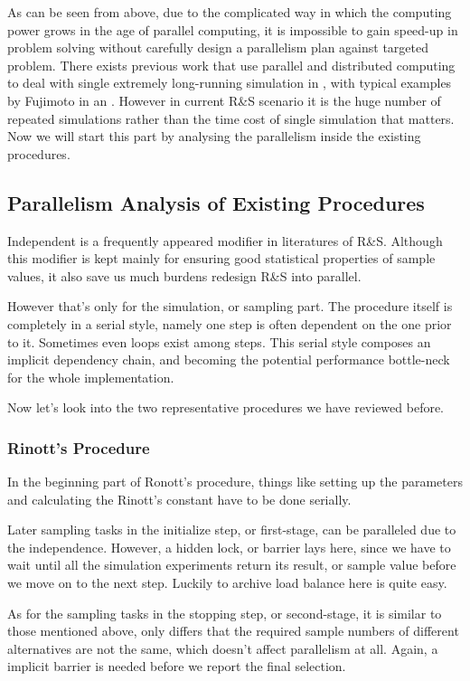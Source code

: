 \documentclass[12pt,a4paper]{report}
\begin{document}
As can be seen from above, due to the complicated way in which the computing power grows in the age of parallel computing, it is impossible to gain speed-up in problem solving without carefully design a parallelism plan against targeted problem. There exists previous work that use parallel and distributed computing to deal with single extremely long-running simulation in \cite{potwsc05ras}, with typical examples by Fujimoto in \cite{cotacm90fuji} an \cite{scsmasm10fuji}. However in current R\&S scenario it is the huge number of repeated simulations rather than the time cost of single simulation that matters. Now we will start this part by analysing the parallelism inside the existing procedures.

\subsection{Parallelism Analysis of Existing Procedures}

Independent is a frequently appeared modifier in literatures of R\&S. Although this modifier is kept mainly for ensuring good statistical properties of sample values, it also save us much burdens redesign R\&S into parallel.

However that's only for the simulation, or sampling part. The procedure itself is completely in a serial style, namely one step is often dependent on the one prior to it. Sometimes even loops exist among steps. This serial style composes an implicit dependency chain, and becoming the potential performance bottle-neck for the whole implementation.

Now let's look into the two representative procedures we have reviewed before.

\subsubsection{Rinott's Procedure}

In the beginning part of Ronott's procedure, things like setting up the parameters and calculating the Rinott's constant have to be done serially.

Later sampling tasks in the initialize step, or first-stage, can be paralleled due to the independence. However, a hidden lock, or barrier lays here, since we have to wait until all the simulation experiments return its result, or sample value before we move on to the next step. Luckily to archive load balance here is quite easy.

As for the sampling tasks in the stopping step, or second-stage, it is similar to those mentioned above, only differs that the required sample numbers of different alternatives are not the same, which doesn't affect parallelism at all. Again, a implicit barrier is needed before we report the final selection.
\end{document}
